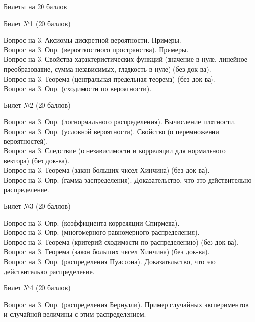 \documentclass[preview]{standalone}
\begin{document}
\thispagestyle{empty}

\begin{center}
    Билеты на 20 баллов
\end{center}
\begin{center} {\Large Билет №1 (20 баллов)} \end{center}
Вопрос на 3. Аксиомы дискретной вероятности. Примеры. \\
Вопрос на 3.  Опр. (вероятностного пространства). Примеры. \\
Вопрос на 3.  Свойства характеристических функций (значение в нуле, линейное преобразование, сумма независимых, гладкость в нуле) (без док-ва). \\
Вопрос на 3.  Теорема (центральная предельная теорема) (без док-ва). \\
Вопрос на 3.  Опр. (сходимости по вероятности). \\
\begin{center} {\Large Билет №2 (20 баллов)} \end{center}
Вопрос на 3.  Опр. (логнормального распределения). Вычисление плотности. \\
Вопрос на 3.  Опр. (условной вероятности).  Свойство (о перемножении вероятностей). \\ 
Вопрос на 3. Следствие (о независимости и корреляции для нормального вектора) (без док-ва). \\ 
Вопрос на 3.  Теорема (закон больших чисел Хинчина) (без док-ва). \\
Вопрос на 3.  Опр. (гамма распределения). Доказательство, что это действительно распределение. \\
\begin{center} {\Large Билет №3 (20 баллов)} \end{center}
Вопрос на 3. Опр. (коэффициента корреляции Спирмена). \\
Вопрос на 3.  Опр. (многомерного равномерного распределения). \\
Вопрос на 3. Теорема (критерий сходимости по распределению) (без док-ва). \\
Вопрос на 3.  Теорема (закон больших чисел Хинчина) (без док-ва). \\
Вопрос на 3.   Опр. (распределения Пуассона). Доказательство, что это действительно распределение. \\
\begin{center} {\Large Билет №4 (20 баллов)} \end{center}
Вопрос на 3. Опр. (распределения Бернулли).  Пример случайных экспериментов и случайной величины с этим распределением. \\
\end{document}
